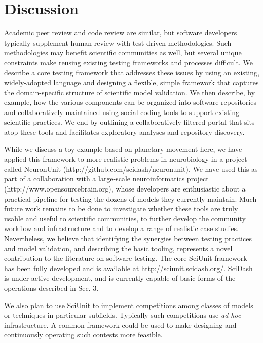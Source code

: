 \documentclass[9pt]{sig-alternate}
\begin{document}
\section{Discussion}
Academic peer review and code review are similar, but software developers typically supplement human review with test-driven methodologies. Such methodologies may benefit scientific communities as well, but several unique  constraints make reusing existing testing frameworks and processes difficult. We describe a core testing framework that addresses these issues  by using an existing, widely-adopted language and designing a flexible, simple framework that captures the domain-specific structure of scientific model validation. We then describe, by example, how the various components can be organized into software repositories and collaboratively maintained using social coding tools to support existing scientific practices. We end by outlining a collaboratively filtered portal that sits atop these tools and facilitates exploratory analyses and repository discovery. 

While we discuss a toy example based on planetary movement here, we have applied this framework to more realistic problems in neurobiology in a project called NeuronUnit (http://github.com/scidash/neuronunit). We have used this as part of a collaboration with a large-scale neuroinformatics project (http://www.opensourcebrain.org), whose developers are enthusiastic about a practical pipeline for testing the dozens of models they currently maintain. Much future work remains to be done to investigate whether these tools are truly usable and useful to scientific communities, to further develop the community workflow and infrastructure and to develop a range of realistic case studies. Nevertheless, we believe that identifying the synergies between testing practices and model validation, and describing the basic tooling, represents a novel contribution to the literature on software testing. The core SciUnit framework has been fully developed and is available at http://sciunit.scidash.org/. SciDash is under active development, and is currently capable of basic forms of the operations described in Sec. 3. 

We also plan to use SciUnit to implement competitions among classes of models or techniques in particular subfields. Typically such competitions use \emph{ad hoc} infrastructure. A common framework could be used to make designing and continuously operating such contests more feasible. 
\end{document}
